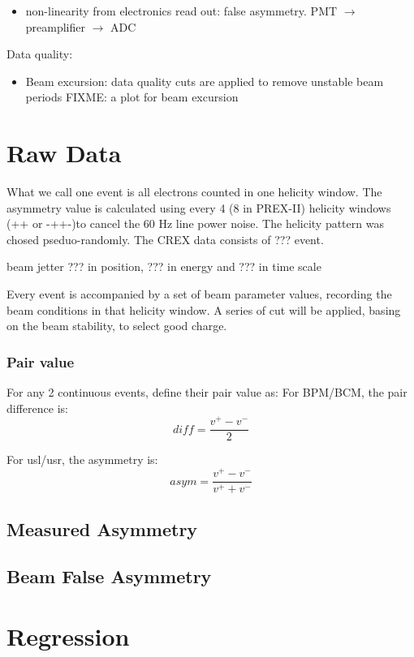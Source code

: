 \begin{itemize}
    \item non-linearity from electronics read out: false asymmetry. PMT $\rightarrow$
	preamplifier $\rightarrow$ ADC
\end{itemize}

Data quality:
\begin{itemize}
    \item Beam excursion: data quality cuts are applied to remove unstable beam periods
	FIXME: a plot for beam excursion
\end{itemize}

\section{Raw Data}
What we call one event is all electrons counted in one helicity window.
The asymmetry value is calculated using every 4 (8 in PREX-II) helicity windows
(+\-\-+ or -++-)to cancel the 60 Hz line power noise. The helicity pattern was
chosed pseduo-randomly. The CREX data consists of ??? event.

beam jetter ??? in position, ??? in energy and ??? in time scale

Every event
is accompanied by a set of beam parameter values, recording the beam conditions
in that helicity window. A series of cut will be applied, basing on the beam
stability, to select good charge.

\subsubsection{Pair value}
For any 2 continuous events, define their pair value as:
For BPM/BCM, the pair difference is:
$$ diff = \frac{v^+ - v^-}{2} $$

For usl/usr, the asymmetry is:
$$ asym = \frac{v^+ - v^-}{v^+ + v^-} $$

\subsection{Measured Asymmetry}
\subsection{Beam False Asymmetry}

\section{Regression}
